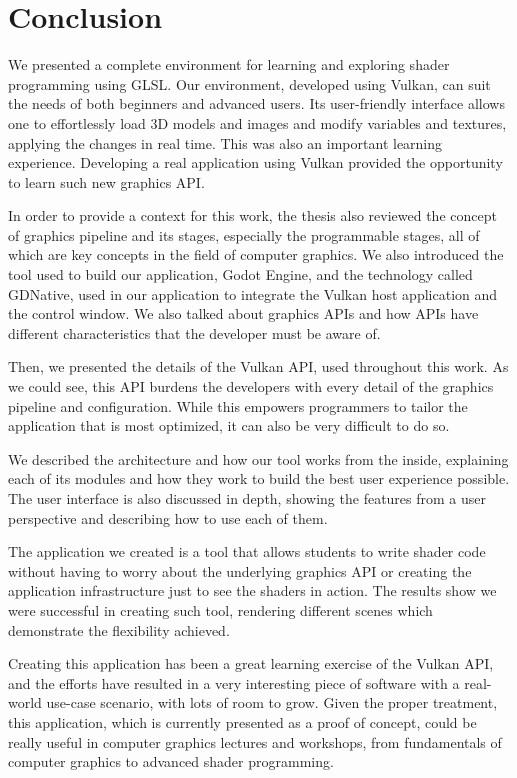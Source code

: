 \chapter{Conclusion}
We presented a complete environment for learning and exploring shader
programming using GLSL. Our environment, developed using Vulkan, can suit the needs of both beginners and advanced users. Its user-friendly interface allows one to effortlessly load 3D models and images and modify variables and textures, applying the changes in real time. This was also an important learning experience. Developing a real application using  Vulkan provided the opportunity to learn such new graphics API. 

In order to provide a context for this work, the thesis also reviewed the concept of graphics pipeline and its stages, especially the programmable stages, all of which are key concepts in the field of computer graphics. We also introduced the tool used to build our application, Godot Engine, and the technology called GDNative, used in our application to integrate the Vulkan host application and the control window. We also talked about graphics APIs and how APIs have different characteristics that the developer must be aware of.

Then, we presented the details of the Vulkan API, used throughout this work. As we could see, this API burdens the developers with every detail of the graphics pipeline and configuration. While this empowers programmers to tailor the application that is most optimized, it can also be very difficult to do so.

We described the architecture and how our tool works from the inside, explaining each of its modules and how they work to build the best user experience possible. The user interface is also discussed in depth, showing the features from a user perspective and describing how to use each of them.

The application we created is a tool that allows students to write shader code without having to worry about the underlying graphics API or creating the application infrastructure just to see the shaders in action. The results show we were successful in creating such tool, rendering different scenes which demonstrate the flexibility achieved.

Creating this application has been a great learning exercise of the Vulkan API, and the efforts have resulted in a very interesting piece of software with a real-world use-case scenario, with lots of room to grow. Given the proper treatment, this application, which is currently presented as a proof of concept, could be really useful in computer graphics lectures and workshops, from fundamentals of computer graphics to advanced shader programming.

